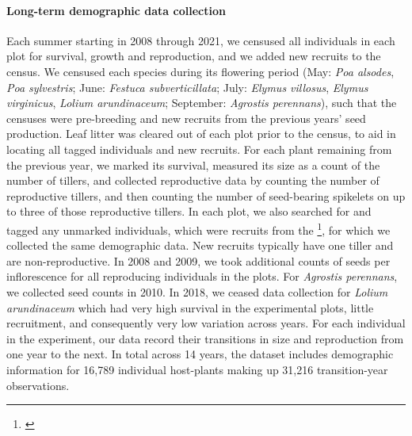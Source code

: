 \documentclass[12pt]{article}
\newcommand{\tom}[2]{{\color{red}{#1}}\footnote{\textit{\color{red}{#2}}}}
\begin{document}
\paragraph*{Long-term demographic data collection}
Each summer starting in 2008 through 2021, we censused all individuals in each plot for survival, growth and reproduction, and we added new recruits to the census. 
We censused each species during its flowering period (May: \emph{Poa alsodes}, \emph{Poa sylvestris}; June: \emph{Festuca subverticillata}; July: \emph{Elymus villosus}, \emph{Elymus virginicus}, \emph{Lolium arundinaceum}; September: \emph{Agrostis perennans}), such that the censuses were pre-breeding and new recruits from the previous years' seed production.
Leaf litter was cleared out of each plot prior to the census, to aid in locating all tagged individuals and new recruits.
For each plant remaining from the previous year, we marked its survival, measured its size as a count of the number of tillers, and collected reproductive data by counting the number of reproductive tillers, and then counting the number of seed-bearing spikelets on up to three of those reproductive tillers. 
In each plot, we also searched for and tagged any unmarked individuals, which were recruits from the \tom{previous years' seed production}{This is an assumption that we should be explicit about. It's also possible that these seedlings came up from an older seedbank.}, for which we collected the same demographic data.
New recruits typically have one tiller and are non-reproductive. 
In 2008 and 2009, we took additional counts of seeds per inflorescence for all reproducing individuals in the plots. 
For \emph{Agrostis perennans}, we collected seed counts in 2010.
In 2018, we ceased data collection  for \emph{Lolium arundinaceum} which had very high survival in the experimental plots, little recruitment, and consequently very low variation across years.
For each individual in the experiment, our data record their transitions in size and reproduction from one year to the next. 
In total across 14 years, the dataset includes demographic information for 16,789 individual host-plants making up 31,216 transition-year observations.
\end{document}
